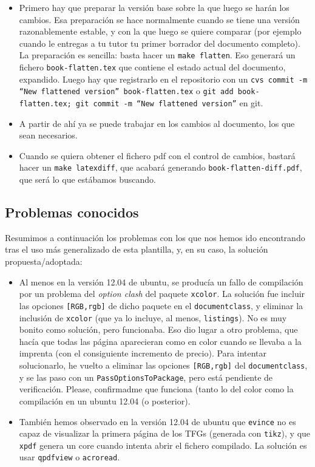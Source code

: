 \documentclass[spanish,openright]{book}
\begin{document}
\begin{itemize}
\item Primero hay que preparar la versión base sobre la que luego se
  harán los cambios. Esa preparación se hace normalmente cuando se
  tiene una versión razonablemente estable, y con la que luego se
  quiere comparar (por ejemplo cuando le entregas a tu tutor tu primer
  borrador del documento completo). La preparación es sencilla: basta
  hacer un \texttt{make flatten}. Eso generará un fichero
  \texttt{book-flatten.tex} que contiene el estado actual del
  documento, expandido. Luego hay que registrarlo en el repositorio
  con un \texttt{cvs commit -m ``New flattened version''
    book-flatten.tex} o \texttt{git add book-flatten.tex; git commit
    -m ``New flattened version''} en git.
\item A partir de ahí ya se puede trabajar en los cambios al documento,
  los que sean necesarios.
\item Cuando se quiera obtener el fichero pdf con el control de cambios,
  bastará hacer un \texttt{make latexdiff}, que acabará generando
  \texttt{book-flatten-diff.pdf}, que será lo que estábamos buscando.
\end{itemize}



\subsection{Problemas conocidos}
\label{sec:problemas-conocidos}

Resumimos a continuación los problemas con los que nos hemos ido
encontrando tras el uso más generalizado de esta plantilla, y, en su
caso, la solución propuesta/adoptada:

\begin{itemize}

\item Al menos en la versión 12.04 de ubuntu, se producía un fallo de
  compilación por un problema del \textit{option clash} del paquete
  \texttt{xcolor}. La solución fue incluir las opciones
  \texttt{[RGB,rgb]} de dicho paquete en el \texttt{documentclass}, y
  eliminar la inclusión de \texttt{xcolor} (que ya lo incluye, al menos,
  \texttt{listings}). No es muy bonito como solución, pero
  funcionaba. Eso dio lugar a otro problema, que hacía que todas las
  página aparecieran como en color cuando se llevaba a la imprenta (con
  el consiguiente incremento de precio). Para intentar solucionarlo, he
  vuelto a eliminar las opciones \texttt{[RGB,rgb]} del
  \texttt{documentclass}, y se las paso con un
  \texttt{PassOptionsToPackage}, pero está pendiente de
  verificación. Please, confirmadme que funciona (tanto lo del color
  como la compilación en un ubuntu 12.04 (o posterior).

\item También hemos observado en la versión 12.04 de ubuntu que
  \texttt{evince} no es capaz de visualizar la primera página de los
  TFGs (generada con \texttt{tikz}), y que \texttt{xpdf} genera un core
  cuando intenta abrir el fichero compilado. La solución es usar
  \texttt{qpdfview} o \texttt{acroread}. 

\end{itemize}
\end{document}
